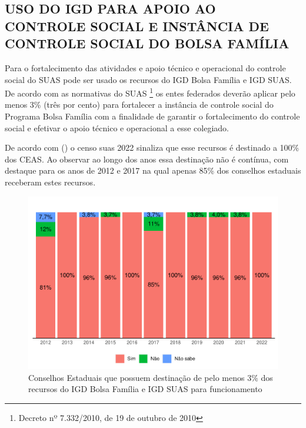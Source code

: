 \documentclass[
  brazilian]{report}
\begin{document}
\hypertarget{uso-do-igd-para-apoio-ao-controle-social-e-instuxe2ncia-de-controle-social-do-bolsa-famuxedlia}{%
\subsection{USO DO IGD PARA APOIO AO CONTROLE SOCIAL E INSTÂNCIA DE
CONTROLE SOCIAL DO BOLSA
FAMÍLIA}\label{uso-do-igd-para-apoio-ao-controle-social-e-instuxe2ncia-de-controle-social-do-bolsa-famuxedlia}}

Para o fortalecimento das atividades e apoio técnico e operacional do
controle social do SUAS pode ser usado os recursos do IGD Bolsa Família
e IGD SUAS. De acordo com as normativas do SUAS
\footnote{Decreto nº 7.332/2010, de 19 de outubro de 2010} os entes
federados deverão aplicar pelo menos 3\% (três por cento) para
fortalecer a instância de controle social do Programa Bolsa Família com
a finalidade de garantir o fortalecimento do controle social e efetivar
o apoio técnico e operacional a esse colegiado.

De acordo com () o censo suas 2022 sinaliza que esse
recursos é destinado a 100\% dos CEAS. Ao observar ao longo dos anos
essa destinação não é contínua, com destaque para os anos de 2012 e 2017
na qual apenas 85\% dos conselhos estaduais receberam estes recursos.

\begin{figure}
\includegraphics{Censo-SUAS-2022_files/figure-latex/ceas_igd-1} \caption[Conselhos Estaduais que possuem destinação de pelo menos 3$\%$ dos recursos do IGD Bolsa Família e IGD SUAS para funcionamento]{Conselhos Estaduais que possuem destinação de pelo menos 3$\%$ dos recursos do IGD Bolsa Família e IGD SUAS para funcionamento}\label{fig:ceas_igd}
\end{figure}
\end{document}
